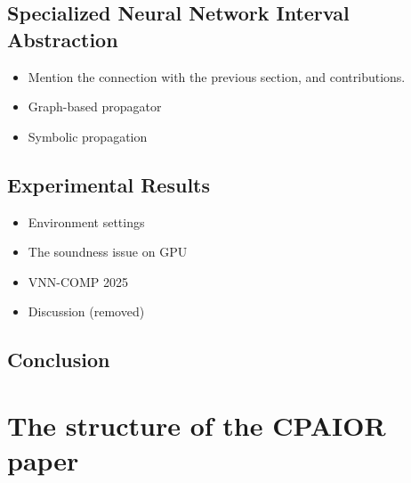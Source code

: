 \documentclass[a4paper]{report}
\begin{document}
\section{Specialized Neural Network Interval Abstraction}
\begin{itemize}
\item Mention the connection with the previous section, and contributions. 
\item Graph-based propagator
\item Symbolic propagation
\end{itemize}

\section{Experimental Results}
\begin{itemize}
\item Environment settings
\item The soundness issue on GPU 
\item VNN-COMP 2025 
\item Discussion (removed)
\end{itemize}

\section{Conclusion}

\chapter{The structure of the CPAIOR paper}
\end{document}
